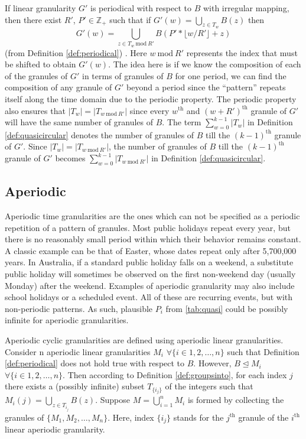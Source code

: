 \documentclass[12pt]{article}
\begin{document}
If linear granularity \(G'\) is periodical with respect to \(B\) with irregular mapping, then there exist \(R'\), \(P' \in \mathbb{Z}_+\) such that if \(G'(w) = \bigcup_{z \in T_w}B(z)\) then \[G'(w) = \bigcup_{z \in T_w ~\text{mod}~R'}B(P'*\lfloor w/R' \rfloor + z)\] (from Definition \ref{def:periodical}) . Here \(w ~\text{mod}~R'\) represents the index that must be shifted to obtain \(G'(w)\). The idea here is if we know the composition of each of the granules of \(G'\) in terms of granules of \(B\) for one period, we can find the composition of any granule of \(G'\) beyond a period since the ``pattern'' repeats itself along the time domain due to the periodic property. The periodic property also ensures that \(\vert T_w \vert = \vert T_{w~\text{mod}~R'} \vert\) since every \(w^{\text{th}}\) and \((w+R')^{\text{th}}\) granule of \(G'\) will have the same number of granules of \(B\). The term \(\sum_{w=0}^{k-1}\vert T_{w}\vert\) in Definition \autoref{def:quasicircular} denotes the number of granules of \(B\) till the \((k-1)^{\text{th}}\) granule of \(G'\). Since \(\vert T_w \vert = \vert T_{w~\text{mod}~R'} \vert\), the number of granules of \(B\) till the \((k-1)^{\text{th}}\) granule of \(G'\) becomes \(\sum_{w=0}^{k-1}\vert T_{w ~\text{mod}~R'}\vert\) in Definition \autoref{def:quasicircular}.

\hypertarget{sec:aperiodic-gran-def}{%
\subsection{Aperiodic}\label{sec:aperiodic-gran-def}}

Aperiodic time granularities are the ones which can not be specified as a periodic repetition of a pattern of granules. Most public holidays repeat every year, but there is no reasonably small period within which their behavior remains constant. A classic example can be that of Easter, whose dates repeat only after 5,700,000 years. In Australia, if a standard public holiday falls on a weekend, a substitute public holiday will sometimes be observed on the first non-weekend day (usually Monday) after the weekend. Examples of aperiodic granularity may also include school holidays or a scheduled event. All of these are recurring events, but with non-periodic patterns. As such, plausible \(P_i\) from \autoref{tab:quasi} could be possibly infinite for aperiodic granularities.

\noindent Aperiodic cyclic granularities are defined using aperiodic linear granularities. Consider n aperiodic linear granularities \(M_i\) \(\forall \{i\in{1, 2, \dots, n\}}\) such that Definition \ref{def:periodical} does not hold true with respect to \(B\). However, \(B \trianglelefteq M_i\) \(\forall \{i\in{1, 2, \dots, n\}}\). Then according to Definition \ref{def:groupsinto}, for each index \(j\) there exists a (possibly infinite) subset \(T_{\{i_j\}}\) of the integers such that \(M_{i}(j) = \bigcup_{z \in T_{i_j}}B(z)\). Suppose \(M = \bigcup_{i=1}^{n}M_{i}\) is formed by collecting the granules of \(\{M_1, M_2, \dots, M_n\}\). Here, index \({\{i_j\}}\) stands for the \(j^{\text{th}}\) granule of the \(i^{\text{th}}\) linear aperiodic granularity.
\end{document}
